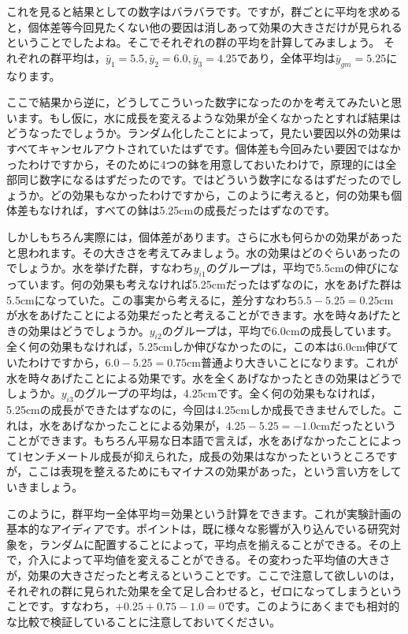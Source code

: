 \documentclass{ltjbook}
\begin{document}
これを見ると結果としての数字はバラバラです。ですが，群ごとに平均を求めると，個体差等今回見たくない他の要因は消しあって効果の大きさだけが見られるということでしたよね。そこでそれぞれの群の平均を計算してみましょう。
それぞれの群平均は，$\bar{y}_1 = 5.5,\bar{y}_2 = 6.0,\bar{y}_3 = 4.25$であり，全体平均は$\bar{y}_{gm}= 5.25$になります。

ここで結果から逆に，どうしてこういった数字になったのかを考えてみたいと思います。もし仮に，水に成長を変えるような効果が全くなかったとすれば結果はどうなったでしょうか。ランダム化したことによって，見たい要因以外の効果はすべてキャンセルアウトされていたはずです。個体差も今回みたい要因ではなかったわけですから，そのために4つの鉢を用意しておいたわけで，原理的には全部同じ数字になるはずだったのです。ではどういう数字になるはずだったのでしょうか。どの効果もなかったわけですから，このように考えると，何の効果も個体差もなければ，すべての鉢は5.25cmの成長だったはずなのです。

しかしもちろん実際には，個体差があります。さらに水も何らかの効果があったと思われます。その大きさを考えてみましょう。水の効果はどのぐらいあったのでしょうか。水を挙げた群，すなわち$y_{i1}$のグループは，平均で5.5cmの伸びになっています。何の効果も考えなければ5.25cmだったはずなのに，水をあげた群は5.5cmになっていた。この事実から考えるに，差分すなわち$5.5-5.25=0.25$cmが水をあげたことによる効果だったと考えることができます。水を時々あげたときの効果はどうでしょうか。$y_{i2}$のグループは，平均で6.0cmの成長しています。全く何の効果もなければ，5.25cmしか伸びなかったのに，この本は6.0cm伸びていたわけですから，$6.0-5.25=0.75$cm普通より大きいことになります。これが水を時々あげたことによる効果です。水を全くあげなかったときの効果はどうでしょうか。$y_{i3}$のグループの平均は，4.25cmです。全く何の効果もなければ，5.25cmの成長ができたはずなのに，今回は4.25cmしか成長できませんでした。これは，水をあげなかったことによる効果が，$4.25-5.25=-1.0$cmだったということができます。もちろん平易な日本語で言えば，水をあげなかったことによって1センチメートル成長が抑えられた，成長の効果はなかったというところですが，ここは表現を整えるためにもマイナスの効果があった，という言い方をしていきましょう。

このように，群平均ー全体平均＝効果という計算をできます。これが実験計画の基本的なアイディアです。ポイントは，既に様々な影響が入り込んでいる研究対象を，ランダムに配置することによって，平均点を揃えることができる。その上で，介入によって平均値を変えることができる。その変わった平均値の大きさが，効果の大きさだったと考えるということです。ここで注意して欲しいのは，それぞれの群に見られた効果を全て足し合わせると，ゼロになってしまうということです。すなわち，$+0.25+0.75-1.0=0$です。このようにあくまでも相対的な比較で検証していることに注意しておいてください。
\end{document}
